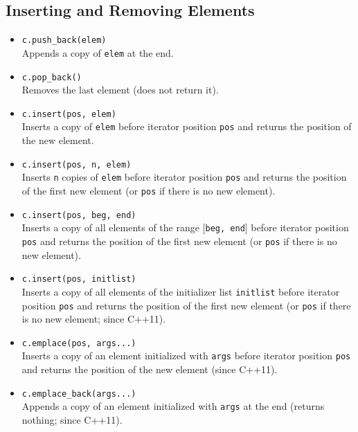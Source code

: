\documentclass{report}
\begin{document}
\subsection{Inserting and Removing Elements}
\begin{itemize}
    \item \texttt{c.push\_back(elem)} \\
          Appends a copy of \texttt{elem} at the end.
          
    \item \texttt{c.pop\_back()} \\
          Removes the last element (does not return it).
    \item \texttt{c.insert(pos, elem)} \\
          Inserts a copy of \texttt{elem} before iterator position \texttt{pos} and returns the position of the new element.
          
    \item \texttt{c.insert(pos, n, elem)} \\
          Inserts \texttt{n} copies of \texttt{elem} before iterator position \texttt{pos} and returns the position of the first new element (or \texttt{pos} if there is no new element).
          
    \item \texttt{c.insert(pos, beg, end)} \\
          Inserts a copy of all elements of the range [\texttt{beg, end}] before iterator position \texttt{pos} and returns the position of the first new element (or \texttt{pos} if there is no new element).
          
    \item \texttt{c.insert(pos, initlist)} \\
          Inserts a copy of all elements of the initializer list \texttt{initlist} before iterator position \texttt{pos} and returns the position of the first new element (or \texttt{pos} if there is no new element; since C++11).
          
    \item \texttt{c.emplace(pos, args...)} \\
          Inserts a copy of an element initialized with \texttt{args} before iterator position \texttt{pos} and returns the position of the new element (since C++11).
          
    \item \texttt{c.emplace\_back(args...)} \\
          Appends a copy of an element initialized with \texttt{args} at the end (returns nothing; since C++11).
          

\end{itemize}
\end{document}
